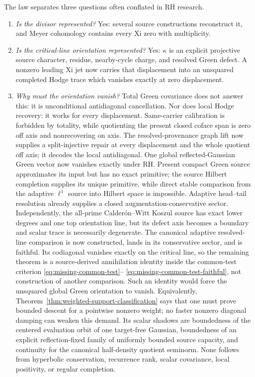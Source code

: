 \documentclass[11pt]{article}
\theoremstyle{definition}
\theoremstyle{remark}
\begin{document}
The law separates three questions often conflated in RH research.

\begin{enumerate}[leftmargin=2.2em]
\item \emph{Is the divisor represented?}  Yes: several source
      constructions reconstruct it, and Meyer cohomology contains every
      Xi zero with multiplicity.
\item \emph{Is the critical-line orientation represented?}  Yes:
      \(\kappa\) is an explicit projective source character, residue,
      nearby-cycle charge, and resolved Green defect.  A nonzero leading Xi
      jet now carries that displacement into an unsquared completed Hodge
      trace which vanishes exactly at zero displacement.
\item \emph{Why must the orientation vanish?}  Total Green covariance does
      not answer this: it is unconditional antidiagonal cancellation.
      Nor does local Hodge recovery: it works for every displacement.
      Same-carrier calibration is forbidden by totality, while quotienting
      the present closed coface span is zero off axis and nonrecovering on
      axis.  The resolved-provenance graph lift now supplies a split-injective
      repair at every displacement and the whole quotient off axis; it decodes
      the local antidiagonal.  One global
      reflected-Gaussian Green vector now vanishes exactly under RH.  Present
      compact Green source approximates its input but has no exact primitive;
      the source Hilbert completion supplies its unique primitive, while
      direct stable comparison from the adaptive \(\ell^1\) source into
      Hilbert space is impossible.  Adaptive head--tail resolution already
      supplies a closed augmentation-conservative sector.  Independently,
      the all-prime Calder\'on--Witt Koszul source has exact lower degrees and
      one top orientation line, but its defect axis becomes a boundary and
      scalar trace is necessarily degenerate.  The canonical adaptive
      resolved-line comparison is now constructed, lands in its conservative
      sector, and is faithful.  Its codiagonal vanishes exactly on the
      critical line, so the remaining theorem is a source-derived
      annihilation identity inside the common-test criterion
      \eqref{eq:missing-common-test}--
      \eqref{eq:missing-common-test-faithful}, not construction of another
      comparison.  Such an identity would force the unsquared global Green
      orientation to vanish.  Equivalently,
      Theorem~\ref{thm:weighted-support-classification} says that one must
      prove bounded descent for a pointwise nonzero weight; no faster
      nonzero diagonal damping can weaken this demand.  Its scalar
      shadows are boundedness of the centered evaluation orbit of one
      target-free Gaussian, boundedness of an explicit reflection-fixed
      family of uniformly bounded source capacity, and continuity for the
      canonical half-density quotient seminorm.  None follows from
      hyperbolic conservation, recurrence rank, scalar covariance, local
      positivity, or regular completion.
\end{enumerate}
\end{document}
